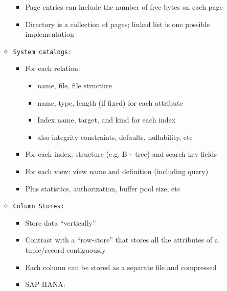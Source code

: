 \documentclass[landscape,8pt]{extarticle}
\newcommand{\code}{\lstinline}
\begin{document}
\begin{multicols}{5}
\begin{itemize}
\begin{itemize}
                        \begin{itemize}
                            \item Page entries can include the number of free bytes on each page
                            \item Directory is a collection of pages; linked list is one possible implementation
                        \end{itemize}
                  \item \code{System catalogs:}
                        \begin{itemize}
                            \item For each relation:
                                  \begin{itemize}
                                      \item name, file, file structure
                                      \item name, type, length (if fixed) for each attribute
                                      \item Index name, target, and kind for each index
                                      \item also integrity constraints, defaults, nullability, etc
                                  \end{itemize}
                            \item For each index: structure (e.g. B+ tree) and search key fields
                            \item For each view: view name and definition (including query)
                            \item Plus statistics, authorization, buffer pool size, etc
                        \end{itemize}
                  \item \code{Column Stores:}
                        \begin{itemize}
                            \item Store data ``vertically''
                            \item Contrast with a ``row-store'' that stores all the attributes of a tuple/record contiguously
                            \item Each column can be stored as a separate file and compressed
                            \item SAP HANA:
                                  \begin{itemize}

\end{itemize}
\end{itemize}
\end{itemize}
\end{itemize}
\end{multicols}
\end{document}
